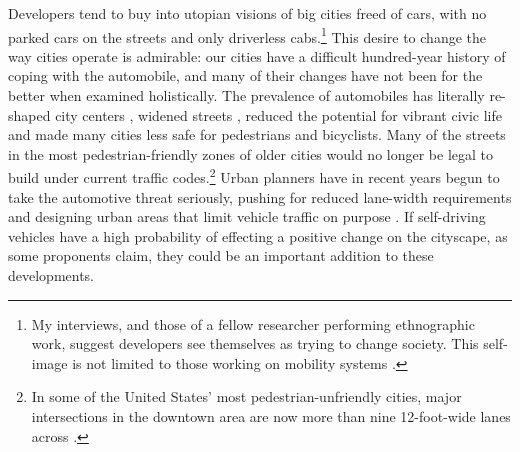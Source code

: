 

Developers tend to buy into utopian visions of big cities freed of cars, with no
parked cars on the streets and only driverless cabs.\footnote{My
  interviews, and those of a fellow
researcher performing ethnographic work, suggest developers see
themselves as trying to change society. This self-image is not limited
to those working on mobility systems \cite{naughtonTech}.} This desire to
change the way cities operate is admirable: our cities have a
difficult hundred-year history of coping with the
automobile, and many of their changes have not been for the better
when examined holistically. The prevalence of automobiles has
literally re-shaped city centers \cite[p. 7]{burdenCities}, widened
streets \cite[p. 10]{burdenCities} \cite[p. 65]{fernandezBoulder},
reduced the potential for vibrant civic life \cite[p. 60]{miaraBoston}
and made many cities less safe for 
pedestrians and bicyclists. Many of the streets in the most
pedestrian-friendly zones of older cities would no longer be legal to
build under 
current traffic codes.\footnote{In some of the
United States' most pedestrian-unfriendly cities, major intersections
in the downtown area are now more than nine 12-foot-wide lanes across
\cite{citylab}.} Urban planners have
in recent years begun to take the automotive threat seriously, pushing
for reduced lane-width requirements and designing urban areas that
limit vehicle traffic on purpose \cite[p. 67]{fernandezBoulder}. If self-driving
vehicles have a high probability of effecting a positive change on the
cityscape, as some proponents claim, they could be an important
addition to these developments.

